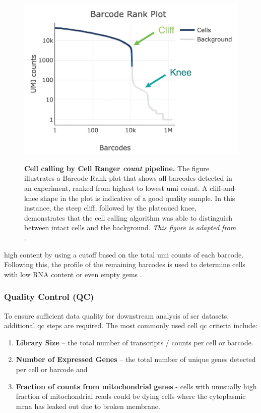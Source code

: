 \begin{figure}
  \centering
  \caption[Cell calling by Cell Ranger \textit{count}]{\textbf{Cell calling by Cell Ranger \textit{count} pipeline.} The figure illustrates a Barcode Rank plot that shows all barcodes detected in an experiment, ranked from highest to lowest \gls{umi} count. A cliff-and-knee shape in the plot is indicative of a good quality sample. In this instance, the steep cliff, followed by the plateaued knee, demonstrates that the cell calling algorithm was able to distinguish between intact cells and the background. \textit{This figure is adapted from }\textbf{\cite{noauthor_barcode_nodate}}.}
  \includegraphics[width=0.5\linewidth]{Chapter1/Fig/F1-10-03.png}
  \label{fig:chp1_cellcall}
\end{figure}

high  content by using a cutoff based on the total \gls{umi} counts of each barcode. Following this, the  profile of the remaining barcodes is used to determine cells with low RNA content or even empty \gls{gem}s \textbf{\cite{noauthor_running_nodate,noauthor_cell_nodate}}.


\subsubsection{Quality Control (QC)}

\par To ensure sufficient data quality for downstream analysis of \gls{scr} datasets, additional \gls{qc} steps are required. The most commonly used cell \gls{qc} criteria include:
\begin{enumerate}
    \item \textbf{Library Size} – the total number of transcripts / counts per cell or barcode.
    \item \textbf{Number of Expressed Genes} – the total number of unique genes detected per cell or barcode and
    \item \textbf{Fraction of counts from mitochondrial genes } - cells with unusually high fraction of mitochondrial reads could be dying cells where the cytoplasmic \gls{mrna} has leaked out due to broken membrane.
\end{enumerate}

